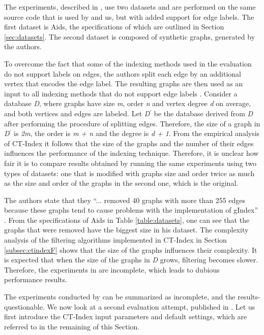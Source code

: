 \documentclass{l4proj}
\begin{document}
The experiments, described in \cite{ctindex}, use two datasets and are performed on the same source code that is used by \cite{foteini} and us, but with added support for edge labels. The first dataset is Aids, the specifications of which are outlined in Section \ref{sec:datasets}. The second dataset is composed of synthetic graphs, generated by the authors.

To overcome the fact that some of the indexing methods used in the evaluation do not support labels on edges, the authors split each edge by an additional vertex that encodes the edge label. The resulting graphs are then used as an input to all indexing methods that do not support edge labels \cite{ctindex}. Consider a database \emph{D}, where graphs have size \emph{m}, order \emph{n} and vertex degree \emph{d} on average, and both vertices and edges are labeled. Let \emph{D$^\prime$} be the database derived from \emph{D} after performing the procedure of splitting edges. Therefore, the size of a graph in \emph{D$^\prime$} is \emph{2m}, the order is \emph{m + n} and the degree is \emph{d + 1}. From the empirical analysis of CT-Index it follows that the size of the graphs and the number of their edges influences the performance of the indexing technique. Therefore, it is unclear how fair it is to compare results obtained by running the same experiments using two types of datasets: one that is modified with graphs size and order twice as much as the size and order of the graphs in the second one, which is the original.
 
The authors state that they ``... removed 40 graphs with more than 255 edges because these graphs tend to cause problems with the implementation of gIndex'' \cite{ctindex}. From the specifications of Aids in Table \ref{table:datasets}, one can see that the graphs that were removed have the biggest size in his dataset. The complexity analysis of the filtering algorithms implemented in CT-Index in Section \ref{subsec:ctindexF} shows that the size of the graphs influences their complexity. It is expected that when the size of the graphs in \emph{D} grows, filtering becomes slower. Therefore, the experiments in \cite{ctindex} are incomplete, which leads to dubious performance results.

The experiments conducted by \cite{ctindex} can be summarized as incomplete, and the results- questionable. We now look at a second evaluation attempt, published in \cite{foteini}. Let us first introduce the CT-Index input parameters and default settings, which are referred to in the remaining of this Section.
\end{document}
